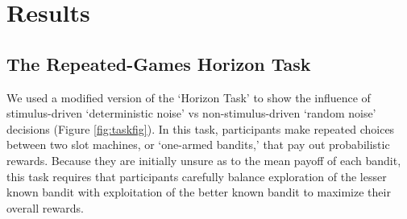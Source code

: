 \documentclass[12pt]{article}
\begin{document}
	
	\section*{Results}
	
	\subsection*{The Repeated-Games Horizon Task}
	We used a modified version of the `Horizon Task' \citep{wilson2014} to show the influence of stimulus-driven `deterministic noise' vs non-stimulus-driven `random noise'  decisions (Figure \ref{fig:taskfig}). In this task, participants make repeated choices between two slot machines, or `one-armed bandits,' that pay out probabilistic rewards. Because they are initially unsure as to the mean payoff of each bandit, this task requires that participants carefully balance exploration of the lesser known bandit with exploitation of the better known bandit to maximize their overall rewards. 
	
\end{document}
